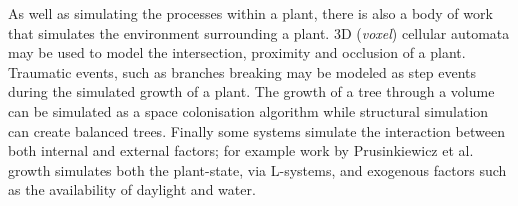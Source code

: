 As well as simulating the processes within a plant, there is also a body of work that simulates the environment surrounding a plant. 3D (\emph{voxel}) cellular automata may be used to model the intersection, proximity and occlusion of a plant\cite{Greene89}. Traumatic events, such as branches breaking may be modeled as step events during the simulated growth of a plant\cite{Reffye88}. The growth of a tree through a volume can be simulated as a space colonisation algorithm\cite{Runions07} while structural simulation can create balanced trees\cite{Hart96}. Finally some systems simulate the interaction between both internal and external factors; for example work by Prusinkiewicz et al. growth\cite{Prusinkiewicz96} simulates both the plant-state, via  L-systems, and exogenous factors such as the availability of daylight and water.
 







